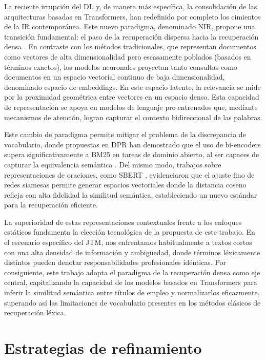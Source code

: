 \noindent La reciente irrupción del \gls{DL} y, de manera más específica, la consolidación de las arquitecturas basadas en Transformers, han redefinido por completo los cimientos de la \gls{IR} contemporánea. Este nuevo paradigma, denominado \gls{NIR}, propone una transición fundamental: el paso de la recuperación dispersa hacia la recuperación densa \cite{karpukhin2020dense}. En contraste con los métodos tradicionales, que representan documentos como vectores de alta dimensionalidad pero escasamente poblados (basados en términos exactos), los modelos neuronales proyectan tanto consultas como documentos en un espacio vectorial continuo de baja dimensionalidad, denominado espacio de embeddings. En este espacio latente, la relevancia se mide por la proximidad geométrica entre vectores en un espacio denso. Esta capacidad de representación se apoya en modelos de lenguaje pre-entrenados que, mediante mecanismos de atención, logran capturar el contexto bidireccional de las palabras. 

Este cambio de paradigma permite mitigar el problema de la discrepancia de vocabulario, donde propuestas en \gls{DPR} han demostrado que el uso de bi-encoders supera significativamente a \gls{BM25} en tareas de dominio abierto, al ser capaces de capturar la equivalencia semántica \cite{karpukhin2020dense}. Del mismo modo, trabajos sobre representaciones de oraciones, como SBERT \cite{reimers2019sentence}, evidenciaron que el ajuste fino de redes siamesas permite generar espacios vectoriales donde la distancia coseno refleja con alta fidelidad la similitud semántica, estableciendo un nuevo estándar para la recuperación eficiente.

La superioridad de estas representaciones contextuales frente a los enfoques estáticos fundamenta la elección tecnológica de la propuesta de este trabajo. En el escenario específico del \gls{JTM}, nos enfrentamos habitualmente a textos cortos con una alta densidad de información y ambigüedad, donde términos léxicamente distintos pueden denotar responsabilidades profesionales idénticas. Por consiguiente, este trabajo adopta el paradigma de la recuperación densa como eje central, capitalizando la capacidad de los modelos basados en Transformers para inferir la similitud semántica entre títulos de empleo y normalizarlos eficazmente, superando así las limitaciones de vocabulario presentes en los métodos clásicos de recuperación léxica.

\section{Estrategias de refinamiento}
\label{sec:Refinamiento}

